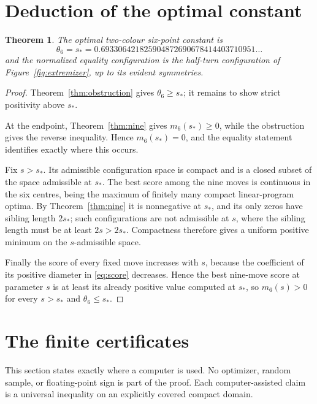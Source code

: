 \documentclass[11pt]{article}
\theoremstyle{plain}
\newtheorem{theorem}{Theorem}[section]
\theoremstyle{definition}
\theoremstyle{remark}
\newcommand{\sstar}{s_{\!*}}
\begin{document}
\section{Deduction of the optimal constant}\label{sec:optimality}

\begin{theorem}\label{thm:main-body}
The optimal two-colour six-point constant is
\[
 \boxed{\theta_6=\sstar=0.693306421825904872690678414403710951\ldots}
\]
and the normalized equality configuration is the half-turn configuration of
Figure~\ref{fig:extremizer}, up to its evident symmetries.
\end{theorem}

\begin{proof}
Theorem~\ref{thm:obstruction} gives $\theta_6\ge\sstar$; it remains to show
strict positivity above $\sstar$.

At the endpoint, Theorem~\ref{thm:nine} gives $m_6(\sstar)\ge0$, while the
obstruction gives the reverse inequality.  Hence $m_6(\sstar)=0$, and the
equality statement identifies exactly where this occurs.

Fix $s>\sstar$.  Its admissible configuration space is compact and is a
closed subset of the space admissible at $\sstar$.  The best score among
the nine moves is continuous in the six centres, being the maximum of
finitely many compact linear-program optima.  By Theorem~\ref{thm:nine} it
is nonnegative at $\sstar$, and its only zeros have sibling length
$2\sstar$; such configurations are not admissible at $s$, where the sibling
length must be at least $2s>2\sstar$.  Compactness therefore gives a
uniform positive minimum on the $s$-admissible space.

Finally the score of every fixed move increases with $s$, because the
coefficient of its positive diameter in \eqref{eq:score} decreases.  Hence
the best nine-move score at parameter $s$ is at least its already positive
value computed at $\sstar$, so $m_6(s)>0$ for every $s>\sstar$ and
$\theta_6\le\sstar$.
\end{proof}

\section{The finite certificates}\label{sec:certificates}

This section states exactly where a computer is used.  No optimizer, random
sample, or floating-point sign is part of the proof.  Each
computer-assisted claim is a universal inequality on an explicitly covered
compact domain.
\end{document}
